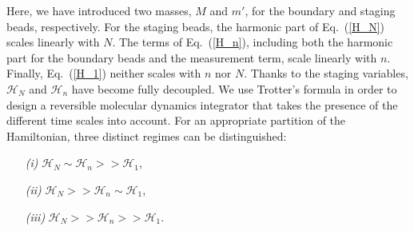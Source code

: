 \documentclass[11pt]{article}
\theoremstyle{definition}
\begin{document}
Here, we have introduced two masses, $M$ and $m'$, for the boundary and staging beads, respectively.
For the staging beads, the harmonic part of Eq.~(\ref{H_N}) scales linearly with $N$. The terms of Eq.~(\ref{H_n}), including both the harmonic part for the boundary beads and the measurement term, scale linearly with $n$. Finally, Eq.~(\ref{H_1}) neither scales with $n$ nor $N$.
Thanks to the staging variables, $\mathcal H_N$ and $\mathcal H_n$ have become fully decoupled.
We use Trotter's formula \cite{tuckerman_1992} in order to design a reversible molecular dynamics integrator that takes the presence of the different time scales into account.
For an appropriate partition of the Hamiltonian, three distinct regimes can be distinguished:

 \begin{enumerate}
   \item[\it (i)]
  $\mathcal H_N \sim \mathcal H_n >> \mathcal H_1$,
  \item[\it (ii)]
  $\mathcal H_N >> \mathcal H_n \sim \mathcal H_1$,
  \item[\it (iii)]
  $\mathcal H_N >> \mathcal H_n >> \mathcal H_1$.
\end{enumerate}
\end{document}
